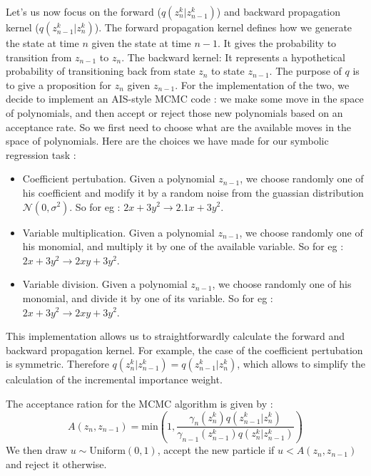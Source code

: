 \documentclass[11pt]{article}
\begin{document}
\begin{itemize}[label=\textbullet]
		Let's us now focus on the forward ($q(z_n^k | z_{n-1}^k)$) and backward propagation kernel ($q(z_{n-1}^k | z_n^k)$). The forward propagation kernel defines how we generate the state at time $n$ given the state at time $n-1$. It gives the probability to transition from $z_{n-1}$ to $z_n$. The backward kernel: It represents a hypothetical probability of transitioning back from state $z_n$ to state $z_{n-1}$. The purpose of $q$ is to give a proposition for $z_n$ given $z_{n-1}$. For the implementation of the two, we decide to implement an AIS-style MCMC code : we make some move in the space of polynomials, and then accept or reject those new polynomials based on an acceptance rate. So we first need to choose what are the available moves in the space of polynomials. Here are the choices we have made for our symbolic regression task : 
		\begin{itemize}
			\item Coefficient pertubation. Given a polynomial $z_{n-1}$, we choose randomly one of his coefficient and modify it by a random noise from the guassian distribution $\mathcal{N}(0,\sigma^2)$. So for eg : $2 x + 3 y^2 \rightarrow  2.1 x + 3 y^2$.
			\item Variable multiplication. Given a polynomial $z_{n-1}$, we choose randomly one of his monomial, and multiply it by one of the available variable. So for eg : $2 x + 3 y^2 \rightarrow  2 x y + 3 y^2$.
			\item Variable division. Given a polynomial $z_{n-1}$, we choose randomly one of his monomial, and divide it by one of its variable. So for eg : $2 x + 3 y^2 \rightarrow  2 x y + 3 y^2$.
		\end{itemize}
		This implementation allows us to straightforwardly calculate the forward and backward propagation kernel.  For example, the case of the coefficient pertubation is symmetric. Therefore $q(z_n^k | z_{n-1}^k) = q(z_{n-1}^k | z_n^k)$, which allows to simplify the calculation of the incremental importance weight. 
		
		The acceptance ration for the MCMC algorithm is given by : 
		\begin{equation}
			A(z_n,z_{n-1}) = \mathrm{min} \left(1,\frac{ \gamma_n(z_n^k) q(z_{n-1}^k | z_n^k) }{ \gamma_{n-1}(z_{n-1}^k) q(z_n^k | z_{n-1}^k) }  \right)
		\end{equation}
		We then draw $u\sim \mathrm{Uniform}(0,1)$, accept the new particle if $u<A(z_n,z_{n-1})$ and reject it otherwise.
		

\end{itemize}
\end{document}

